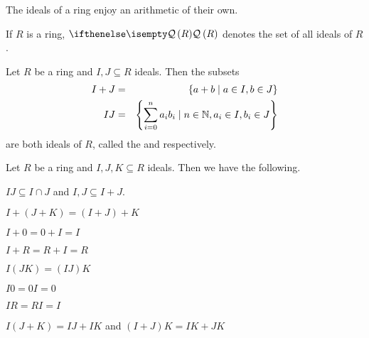 The ideals of a ring enjoy an arithmetic of their own.

\begin{dfn}
If \(R\) is a ring, \(\IDEALS{R}\) denotes the set of all ideals of \(R\).
\end{dfn}

\begin{prop}
Let \(R\) be a ring and \(I, J \subseteq R\) ideals. Then the subsets
\begin{eqnarray*}
I + J & = & \{ a+b \mid a \in I, b \in J \} \\
I   J & = & \left\{ \sum_{i=0}^n a_i b_i \mid n \in \mathbb{N}, a_i \in I, b_i \in J \right\}
\end{eqnarray*}
are both ideals of \(R\), called the  and  respectively.
\end{prop}

\begin{prop}
Let \(R\) be a ring and \(I,J,K \subseteq R\) ideals. Then we have the following.
\begin{proplist}
\item \(IJ \subseteq I \cap J\) and \(I,J \subseteq I+J\).
\item \(I+(J+K) = (I+J)+K\)
\item \(I+0 = 0+I = I\)
\item \(I+R = R+I = R\)
\item \(I(JK) = (IJ)K\)
\item \(I0 = 0I = 0\)
\item \(IR = RI = I\)
\item \(I(J+K) = IJ+IK\) and \((I+J)K = IK+JK\)
\end{proplist}
\end{prop}



\Exercises%

